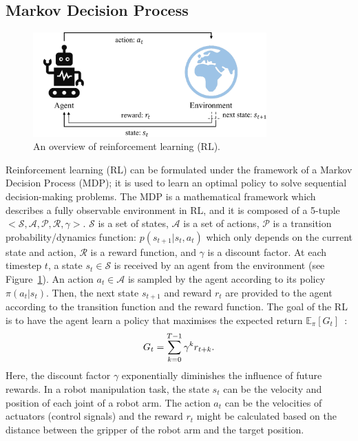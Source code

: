 \subsection{Markov Decision Process}
\begin{figure}[h]
    \centering
    \includegraphics[width=0.8\textwidth]{figures/background/mdp_background.pdf}
    \caption{An overview of reinforcement learning (RL).}
    \label{fig:rl_desc}
\end{figure}
Reinforcement learning (RL) can be formulated under the framework of a Markov Decision Process (MDP); it is used to learn an optimal policy to solve sequential decision-making problems. The MDP is a mathematical framework which describes a fully observable environment in RL, and it is composed of a 5-tuple $<\mathcal{S}, \mathcal{A}, \mathcal{P}, \mathcal{R}, \gamma>$. $\mathcal{S}$ is a set of states, $\mathcal{A}$ is a set of actions, $\mathcal{P}$ is a transition probability/dynamics function: $p(s_{t+1}|s_{t},a_{t})$ which only depends on the current state and action, $\mathcal{R}$ is a reward function, and $\gamma$ is a discount factor. At each timestep $t$, a state $s_{t}\in\mathcal{S}$ is received by an agent from the environment (see Figure~\ref{fig:rl_desc}). An action $a_{t}\in\mathcal{A}$ is sampled by the agent according to its policy $\pi(a_{t}|s_{t})$. Then, the next state $s_{t+1}$ and reward $r_{t}$ are provided to the agent according to the transition function and the reward function. The goal of the RL is to have the agent learn a policy that maximises the expected return $\mathbb{E}_{\pi}[G_{t}]$~\cite{sutton2018reinforcement}:
\begin{equation}
\centering
    G_{t} =\sum_{k=0}^{T-1}\gamma^{k}r_{t+k}.
\label{eq:acc_reward_func}
\end{equation}
Here, the discount factor $\gamma$ exponentially diminishes the influence of future rewards. {In a robot manipulation task, the state $s_{t}$ can be the velocity and position of each joint of a robot arm. The action $a_{t}$ can be the velocities of actuators (control signals)} and the reward $r_{t}$ might be calculated based on the distance between the gripper of the robot arm and the target position.

